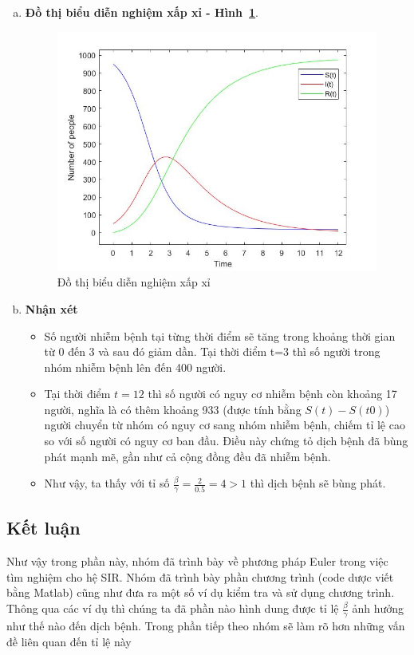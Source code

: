 \begin{enumerate}[a)]
\item \textbf{Đồ thị biểu diễn nghiệm xấp xỉ - Hình~\ref{Fig:vd2}}.
	\begin{figure}[h!]
		\begin{center}
		\includegraphics[scale=0.5]{Images/baitoan2/p2.jpg}
		\end{center}
		\caption{Đồ thị biểu diễn nghiệm xấp xỉ }\label{Fig:vd2}
	\end{figure}
	
\item \textbf{Nhận xét}
	\begin{itemize}
		\item Số người nhiễm bệnh tại từng thời điểm sẽ tăng trong khoảng thời gian từ 0 đến 3 và sau đó giảm dần. Tại thời điểm t=3 thì số người trong nhóm nhiễm bệnh lên đến 400 người.
		\item Tại thời điểm $ t = 12 $ thì số người có nguy cơ nhiễm bệnh còn khoảng 17 người, nghĩa là có thêm khoảng 933 (được tính bằng $ S(t)-S(t0) $) người chuyển từ nhóm có nguy cơ sang nhóm nhiễm bệnh, chiếm tỉ lệ cao so với số người có nguy cơ ban đầu. Điều này chứng tỏ dịch bệnh đã bùng phát mạnh mẽ, gần như cả cộng đồng đều đã nhiễm bệnh.
		\item Như vậy, ta thấy với  tỉ số $ \frac{\beta}{\gamma} = \frac{2}{0.5} = 4 > 1$ thì dịch bệnh sẽ  bùng phát. 
	\end{itemize}
\end{enumerate}

\subsection{Kết luận}
Như vậy trong phần này, nhóm đã trình bày về phương pháp Euler trong việc tìm nghiệm cho hệ SIR. Nhóm đã trình bày phần chương trình (code dược viết bằng Matlab) cũng như đưa ra một số ví dụ kiểm tra và sử dụng chương trình. Thông qua các ví dụ thì chúng ta đã phần nào hình dung được tỉ lệ $ \frac{\beta}{\gamma} $ ảnh hưởng như thế nào đến dịch bệnh. Trong phần tiếp theo nhóm sẽ làm rõ hơn những vấn đề liên quan đến tỉ lệ này